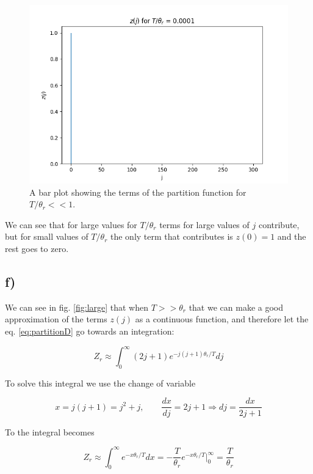 \documentclass[a4paper,norsk, 10pt]{article}
\begin{document}
\begin{figure}[H]
\centering
\includegraphics[scale=0.5]{e_liten.png}
\caption{A bar plot showing the terms of the partition function for $T/\theta_r << 1$.}
\end{figure}\label{fig:small}

We can see that for large values for $T/\theta_r$ terms for large values of $j$ contribute, but for small values of $T/\theta_r$  the only term that contributes is $z(0) = 1$ and the rest goes to zero.


\subsection{f)}
We can see in fig. \ref{fig:large} that when $T >> \theta_r$ that we can make a good approximation of the terms $z(j)$ as a continuous function, and therefore let the eq. \eqref{eq:partitionD} go towards an integration:

\begin{equation}
Z_r \approx \int_0^\infty (2j + 1) e^{-j(j+1)\theta_r/T} dj
\end{equation}\label{eq:large}

To solve this integral we use the change of variable

\begin{equation}
x = j(j+1) = j^2 + j, \qquad \frac{dx}{dj} = 2j + 1 \Rightarrow dj = \frac{dx}{2j+1}
\end{equation}

To the integral becomes

\begin{equation}
Z_r \approx \int_0^\infty e^{-x\theta_r/T} dx = -\frac{T}{\theta_r}e^{-x\theta_r/T} \bigg|_0^\infty = \frac{T}{\theta_r}
\end{equation}\label{eq:ZhightT}
\end{document}
